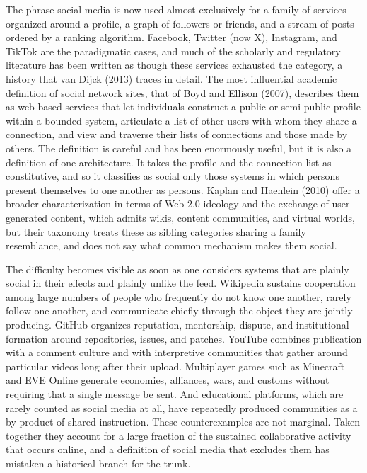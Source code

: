 \documentclass[11pt]{article}
\theoremstyle{remark}
\begin{document}
The phrase social media is now used almost exclusively for a family of services organized around a profile, a graph of followers or friends, and a stream of posts ordered by a ranking algorithm. Facebook, Twitter (now X), Instagram, and TikTok are the paradigmatic cases, and much of the scholarly and regulatory literature has been written as though these services exhausted the category, a history that van Dijck (2013) traces in detail. The most influential academic definition of social network sites, that of Boyd and Ellison (2007), describes them as web-based services that let individuals construct a public or semi-public profile within a bounded system, articulate a list of other users with whom they share a connection, and view and traverse their lists of connections and those made by others. The definition is careful and has been enormously useful, but it is also a definition of one architecture. It takes the profile and the connection list as constitutive, and so it classifies as social only those systems in which persons present themselves to one another as persons. Kaplan and Haenlein (2010) offer a broader characterization in terms of Web 2.0 ideology and the exchange of user-generated content, which admits wikis, content communities, and virtual worlds, but their taxonomy treats these as sibling categories sharing a family resemblance, and does not say what common mechanism makes them social.

The difficulty becomes visible as soon as one considers systems that are plainly social in their effects and plainly unlike the feed. Wikipedia sustains cooperation among large numbers of people who frequently do not know one another, rarely follow one another, and communicate chiefly through the object they are jointly producing. GitHub organizes reputation, mentorship, dispute, and institutional formation around repositories, issues, and patches. YouTube combines publication with a comment culture and with interpretive communities that gather around particular videos long after their upload. Multiplayer games such as Minecraft and EVE Online generate economies, alliances, wars, and customs without requiring that a single message be sent. And educational platforms, which are rarely counted as social media at all, have repeatedly produced communities as a by-product of shared instruction. These counterexamples are not marginal. Taken together they account for a large fraction of the sustained collaborative activity that occurs online, and a definition of social media that excludes them has mistaken a historical branch for the trunk.
\end{document}

